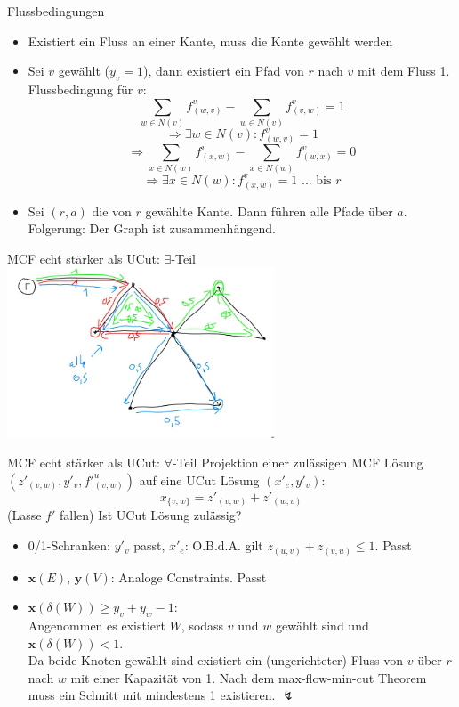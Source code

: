 \documentclass[ngerman,aspectratio=169,10pt]{beamer}
\begin{document}
\begin{frame}{Flussbedingungen}
    \begin{itemize}
        \item Existiert ein Fluss an einer Kante, muss die Kante gewählt werden
        \item Sei $v$ gewählt ($y_v=1$), dann existiert ein Pfad von $r$ nach $v$ mit dem Fluss 1. Flussbedingung für $v$:
        \[\sum_{w\in N(v)} f^v_{(w,v)} - \sum_{w\in N(v)} f^v_{(v,w)}=1\]
        \[\Rightarrow\exists w\in N(v):f^v_{(w,v)}=1\]
        \[\Rightarrow \sum_{x\in N(w)} f^v_{(x,w)} - \sum_{x\in N(w)} f^v_{(w,x)}=0\]
        \[\Rightarrow \exists x\in N(w):f^v_{(x,w)}=1\text{~... bis~}r\]
        \item Sei $(r,a)$ die von $r$ gewählte Kante. Dann führen alle Pfade über $a$.\\
        Folgerung: Der Graph ist zusammenhängend.
    \end{itemize}
\end{frame}

\begin{frame}{MCF echt stärker als UCut: $\exists$-Teil}
    \centering
    \includegraphics[width=300px]{invalid.jpg}
\end{frame}

\begin{frame}{MCF echt stärker als UCut: $\forall$-Teil}
    Projektion einer zulässigen MCF Lösung $(z'_{(v,w)}, y'_v,f'^u_{(v,w)})$ auf eine UCut Lösung $(x'_e, y'_v)$:
    \[x_{\{v,w\}}=z'_{(v,w)}+z'_{(w,v)}\]
    (Lasse $f'$ fallen) Ist UCut Lösung zulässig?
    \begin{itemize}
        \item 0/1-Schranken: $y'_v$ passt, $x'_e$: O.B.d.A. gilt $z_{(u,v)}+z_{(v,u)}\leq1$. Passt
        \item $\pmb{x}(E)$, $\pmb{y}(V)$: Analoge Constraints. Passt
        \item $\pmb{x}(\delta(W))\geq y_v+y_w-1$:\\
        Angenommen es existiert $W$, sodass $v$ und $w$ gewählt sind und $\pmb{x}(\delta(W))<1$.\\
        Da beide Knoten gewählt sind existiert ein (ungerichteter) Fluss von $v$ über $r$ nach $w$ mit einer Kapazität von 1. Nach dem max-flow-min-cut Theorem muss ein Schnitt mit mindestens 1 existieren. \hfill\mbox{\Large{$\lightning$}}
    \end{itemize}
\end{frame}
\end{document}

